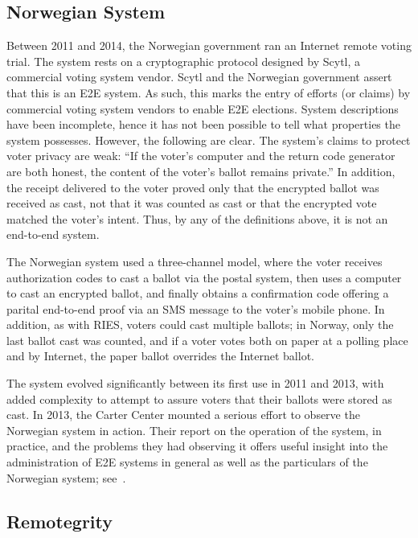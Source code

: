 \subsection{Norwegian System~\cite{gjosteen2012}}

Between 2011 and 2014, the Norwegian government ran an Internet remote
voting trial.  The system rests on a cryptographic protocol designed
by Scytl, a commercial voting system vendor. Scytl and the Norwegian
government assert that this is an E2E system.  As such, this marks the
entry of efforts (or claims) by commercial voting system vendors to
enable E2E elections.  System descriptions have been incomplete, hence
it has not been possible to tell what properties the system
possesses. However, the following are clear.  The system's claims to
protect voter privacy are weak: ``If the voter's computer and the
return code generator are both honest, the content of the voter's
ballot remains private.''  In addition, the receipt delivered to the
voter proved only that the encrypted ballot was received as cast, not
that it was counted as cast or that the encrypted vote matched the
voter's intent. Thus, by any of the definitions above, it is not an
end-to-end system.

The Norwegian system used a three-channel model, where the voter
receives authorization codes to cast a ballot via the postal system,
then uses a computer to cast an encrypted ballot, and finally obtains
a confirmation code offering a parital end-to-end proof via an SMS
message to the voter's mobile phone.  In addition, as with RIES,
voters could cast multiple ballots; in Norway, only the last ballot
cast was counted, and if a voter votes both on paper at a polling
place and by Internet, the paper ballot overrides the Internet ballot.

The system evolved significantly between its first use in 2011 and
2013, with added complexity to attempt to assure voters that their
ballots were stored as cast.  In 2013, the Carter Center mounted a
serious effort to observe the Norwegian system in action.  Their
report on the operation of the system, in practice, and the problems
they had observing it offers useful insight into the administration of
E2E systems in general as well as the particulars of the Norwegian
system; see~\cite{carter2013}.

\subsection{Remotegrity~\cite{zagorski2013}}

